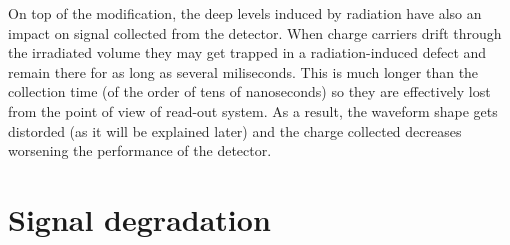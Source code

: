 On top of the \neff modification, the deep levels induced by radiation have also an impact on signal collected from the detector. When charge carriers drift through the irradiated volume they may get trapped in a radiation-induced defect and remain there for as long as several miliseconds. This is much longer than the collection time (of the order of tens of nanoseconds) so they are effectively lost from the point of view of read-out system. As a result, the waveform shape gets distorded (as it will be explained later) and the charge collected decreases worsening the performance of the detector.

\section{Signal degradation} %
\label{sec:signalDeg}



